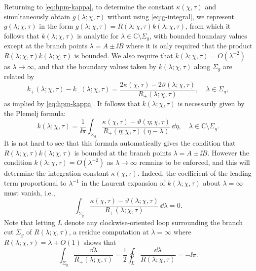 Returning to \eqref{eq:hpm-kappa}, to determine the constant $\kappa(\chi,\tau)$ and simultaneously obtain $g(\lambda;\chi,\tau)$ without using \eqref{eq:g-integral}, we represent $g(\lambda;\chi,\tau)$ in the form $g(\lambda;\chi,\tau)=R(\lambda;\chi,\tau)k(\lambda;\chi,\tau)$, from which it follows that $k(\lambda;\chi,\tau)$ is analytic for $\lambda\in\mathbb{C}\setminus\Sigma_g$, with bounded boundary values except at the branch points $\lambda=A\pm\ii B$ where it is only required that the product $R(\lambda;\chi,\tau)k(\lambda;\chi,\tau)$ is bounded.  We also require that $k(\lambda;\chi,\tau)=O(\lambda^{-2})$ as $\lambda\to\infty$, and that the boundary values taken by $k(\lambda;\chi,\tau)$ along $\Sigma_g$ are related by
\begin{equation}
k_+(\lambda;\chi,\tau)-k_-(\lambda;\chi,\tau)=\frac{2 \kappa(\chi,\tau)-2\vartheta(\lambda;\chi,\tau)}{R_+(\lambda;\chi,\tau)},\quad\lambda\in\Sigma_g,
\end{equation}
as implied by \eqref{eq:hpm-kappa}.
It follows that $k(\lambda;\chi,\tau)$ is necessarily given by the Plemelj formula:
\begin{equation}
k(\lambda;\chi,\tau)=\frac{1}{\ii\pi}\int_{\Sigma_g}\frac{\kappa(\chi,\tau)-\vartheta(\eta;\chi,\tau)}{R_+(\eta;\chi,\tau)(\eta-\lambda)}\,\dd\eta,\quad\lambda\in\mathbb{C}\setminus\Sigma_g.
\label{eq:k-formula}
\end{equation}
It is not hard to see that this formula automatically gives the condition that $R(\lambda;\chi,\tau)k(\lambda;\chi,\tau)$ is bounded at the branch points $\lambda=A\pm\ii B$.  However the condition $k(\lambda;\chi,\tau)=O(\lambda^{-2})$ as $\lambda\to\infty$ remains to be enforced, and this will determine the integration constant $\kappa(\chi,\tau)$.  Indeed, the coefficient of the leading term proportional to $\lambda^{-1}$ in the Laurent expansion of $k(\lambda;\chi,\tau)$ about $\lambda=\infty$ must vanish, i.e.,
\begin{equation}
\int_{\Sigma_g}\frac{\kappa(\chi,\tau)-\vartheta(\lambda;\chi,\tau)}{R_+(\lambda;\chi,\tau)}\,\dd\lambda = 0.
\label{eq:K-integral}
\end{equation}
Note that letting $L$ denote any clockwise-oriented loop surrounding the branch cut $\Sigma_g$ of $R(\lambda;\chi,\tau)$, a residue computation at $\lambda=\infty$ where $R(\lambda;\chi,\tau)=\lambda+O(1)$ shows that
\begin{equation}
\int_{\Sigma_g}\frac{\dd\lambda}{R_+(\lambda;\chi,\tau)} = \frac{1}{2}\oint_L\frac{\dd\lambda}{R(\lambda;\chi,\tau)} =-\ii\pi.
\label{eq:integral-R-plus}
\end{equation}
